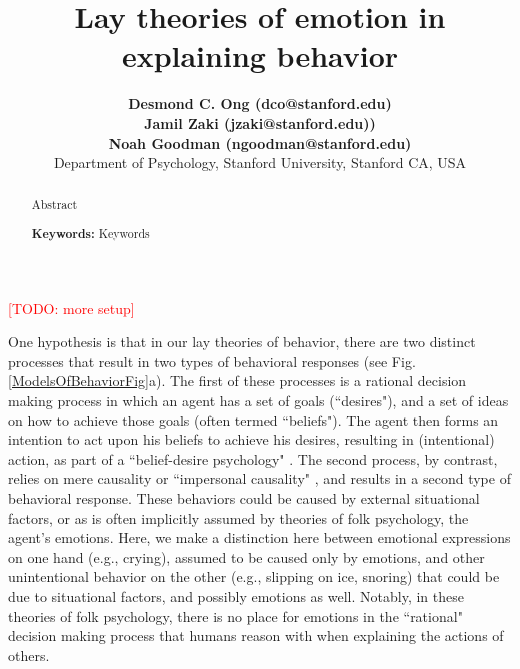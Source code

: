 \documentclass[10pt,letterpaper]{article}
\title{ Lay theories of emotion in explaining behavior }
\author{{\large \bf Desmond C. Ong (dco@stanford.edu)} \\
{\large \bf Jamil Zaki (jzaki@stanford.edu))} \\
{\large \bf Noah Goodman (ngoodman@stanford.edu)} \\
  Department of Psychology, Stanford University, Stanford CA, USA 
}
\newcommand{\red}[1]{\textcolor{Red}{#1}}
\begin{document}
\maketitle

\begin{abstract}
Abstract

\textbf{Keywords:} 
Keywords
\end{abstract}











\red{[TODO: more setup]}


One hypothesis is that in our lay theories of behavior, there are two distinct processes that result in two types of behavioral responses (see Fig. \ref{ModelsOfBehaviorFig}a). The first of these processes is a rational decision making process in which an agent has a set of goals (``desires"), and a set of ideas on how to achieve those goals (often termed ``beliefs"). The agent then forms an intention to act upon his beliefs to achieve his desires, resulting in (intentional) action, as part of a ``belief-desire psychology" \cite{Dennett1989, Gopnik1997, Heider1958, Malle2011, Searle2001}. The second process, by contrast, relies on mere causality or ``impersonal causality" \cite{Heider1958}, and results in a second type of behavioral response. These behaviors could be caused by external situational factors, or as is often implicitly assumed by theories of folk psychology, the agent's emotions. Here, we make a distinction here between emotional expressions on one hand (e.g., crying), assumed to be caused only by emotions, and other unintentional behavior on the other (e.g., slipping on ice, snoring) that could be due to situational factors, and possibly emotions as well. Notably, in these theories of folk psychology, there is no place for emotions in the ``rational" decision making process that humans reason with when explaining the actions of others.
\end{document}
